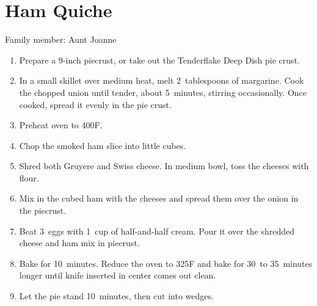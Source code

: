 \chapter{Ham Quiche}
\label{ch:hamquiche}


Family member: Aunt Joanne

\begin{enumerate}
    \item Prepare a 9-inch piecrust, or take out the Tenderflake Deep Dish pie crust.
    \item In a small skillet over medium heat, melt 2~tablespoons of margarine. Cook the chopped union until tender, about 5~minutes, stirring occasionally. Once cooked, spread it evenly in the pie crust.
    \item Preheat oven to 400\degree F.
    \item Chop the smoked ham slice into little cubes.
    \item Shred both Gruyere and Swiss cheese. In medium bowl, toss the cheeses with flour.
    \item Mix in the cubed ham with the cheeses and spread them over the onion in the piecrust.
    \item Beat 3~eggs with 1~cup of half-and-half cream. Pour it over the shredded cheese and ham mix in piecrust.
    \item Bake for 10~minutes. Reduce the oven to 325\degree F and bake for 30~to 35~minutes longer until knife inserted in center comes out clean.
    \item Let the pie stand 10~minutes, then cut into wedges.
\end{enumerate}
